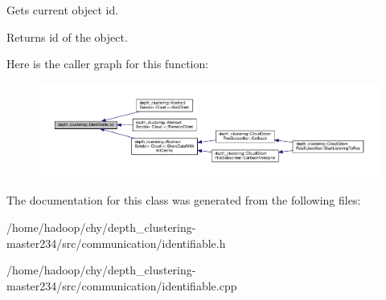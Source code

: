 Gets current object id. 

\begin{DoxyReturn}{Returns}
id of the object. 
\end{DoxyReturn}


Here is the caller graph for this function\-:
\nopagebreak
\begin{figure}[H]
\begin{center}
\leavevmode
\includegraphics[width=350pt]{classdepth__clustering_1_1Identifiable_a020b49a5102a2ef0eec7b9e74add7669_icgraph}
\end{center}
\end{figure}




The documentation for this class was generated from the following files\-:\begin{DoxyCompactItemize}
\item 
/home/hadoop/chy/depth\-\_\-clustering-\/master234/src/communication/identifiable.\-h\item 
/home/hadoop/chy/depth\-\_\-clustering-\/master234/src/communication/identifiable.\-cpp\end{DoxyCompactItemize}
